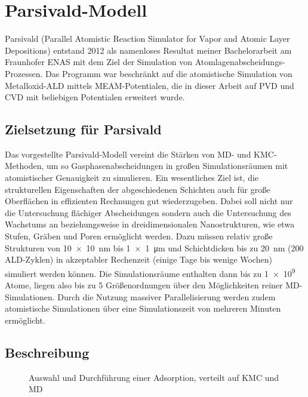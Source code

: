 \section{Parsivald-Modell}
\label{parsivald}

Parsivald (Parallel Atomistic Reaction Simulator for Vapor and Atomic Layer Depositions) entstand 2012 als namenloses Resultat meiner Bachelorarbeit\cite{lorenz_entwicklung_2012} am Fraunhofer ENAS mit dem Ziel der Simulation von Atom\-lagen\-abscheidungs-Prozessen.
Das Programm war beschränkt auf die atomistische Simulation von Metall\-oxid-ALD mittels MEAM-Potentialen, die in dieser Arbeit auf PVD und CVD mit beliebigen Potentialen erweitert wurde.

\subsection{Zielsetzung für Parsivald}

Das vorgestellte Parsivald-Modell vereint die Stärken von MD- und KMC-Methoden, um so Gasphasenabscheidungen in großen Simulationsräumen mit atomistischer Genauigkeit zu simulieren.
Ein wesentliches Ziel ist, die strukturellen Eigenschaften der abgeschiedenen Schichten auch für große Oberflächen in effizienten Rechnungen gut wiederzugeben.
Dabei soll nicht nur die Untersuchung flächiger Abscheidungen sondern auch die Untersuchung des Wachstums an beziehungsweise in dreidimensionalen Nanostrukturen, wie etwa Stufen, Gräben und Poren ermöglicht werden.
Dazu müssen relativ große Strukturen von \SI{10x10}{\nano\meter} bis \SI{1x1}{\micro\meter} und Schichtdicken bis zu \SI{20}{\nano\meter} (\num{200} ALD-Zyklen) in akzeptabler Rechenzeit (einige Tage bis wenige Wochen) simuliert werden können.
Die Simulationsräume enthalten dann bis zu \num{1e9} Atome, liegen also bis zu \num{5} Größenordnungen über den Möglichkeiten reiner MD-Simulationen.
Durch die Nutzung massiver Parallelisierung werden zudem atomistische Simulationen über eine Simulationszeit von mehreren Minuten ermöglicht.

\subsection{Beschreibung}

\begin{figure}[b]
  \centering
  \def\svgwidth{\textwidth}
  
  \caption{Auswahl und Durchführung einer Adsorption, verteilt auf KMC und MD}
  \label{fig:parsivald-schema}
\end{figure}

